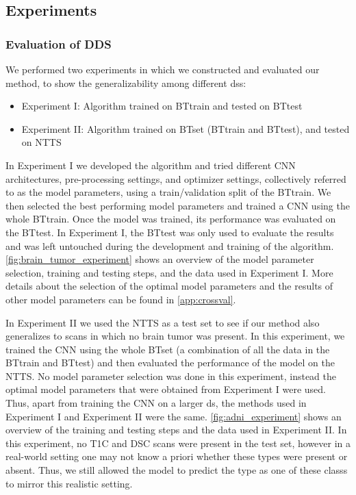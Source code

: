 \subsection{Experiments}
\label{sec:experiments}

\subsubsection{Evaluation of \gls{DDS}}

We performed two experiments in which we constructed and evaluated our method, to show the generalizability among different \glspl{ds}:

\begin{itemize}
    \item Experiment I: Algorithm trained on \gls{BTtrain} and tested on \gls{BTtest}
    \item Experiment II: Algorithm trained on \gls{BTset} (\gls{BTtrain} and \gls{BTtest}), and tested on \gls{NTTS}
\end{itemize}

In Experiment I we developed the algorithm and tried different \gls{CNN} architectures, pre-processing settings, and optimizer settings, collectively referred to as the model parameters, using a train/validation split of the \gls{BTtrain}.
We then selected the best performing model parameters and trained a \gls{CNN} using the whole \gls{BTtrain}.
Once the model was trained, its performance was evaluated on the \gls{BTtest}.
In Experiment I, the \gls{BTtest} was only used to evaluate the results and was left untouched during the development and training of the algorithm.
\cref{fig:brain_tumor_experiment} shows an overview of the model parameter selection, training and testing steps, and the data used in Experiment I.
More details about the selection of the optimal model parameters and the results of other model parameters can be found in \cref{app:crossval}.

In Experiment II we used the \gls{NTTS} as a test set to see if our method also generalizes to \glspl{scan} in which no brain \gls{tumor} was present.
In this experiment, we trained the \gls{CNN} using the whole \gls{BTset} (a combination of all the data in the \gls{BTtrain} and \gls{BTtest}) and then evaluated the performance of the model on the \gls{NTTS}.
No model parameter selection was done in this experiment, instead the optimal model parameters that were obtained from Experiment I were used.
Thus, apart from training the \gls{CNN} on a larger \gls{ds}, the methods used in Experiment I and Experiment II were the same.
\cref{fig:adni_experiment} shows an overview of the training and testing steps and the data used in Experiment II.
In this experiment, no \gls{T1C} and \gls{DSC} \glspl{scan} were present in the test set, however in a real-world setting one may not know a priori whether these \glspl{type} were present or absent.
Thus, we still allowed the model to predict the \gls{type} as one of these \glspl{class} to mirror this realistic setting.

